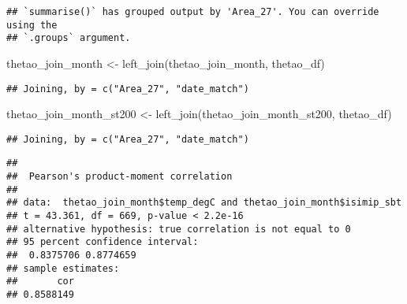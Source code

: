 \documentclass[
]{article}
\newenvironment{Shaded}{\begin{snugshade}}{\end{snugshade}}
\newcommand{\CommentTok}[1]{\textcolor[rgb]{0.56,0.35,0.01}{\textit{#1}}}
\newcommand{\FunctionTok}[1]{\textcolor[rgb]{0.00,0.00,0.00}{#1}}
\newcommand{\NormalTok}[1]{#1}
\newcommand{\OtherTok}[1]{\textcolor[rgb]{0.56,0.35,0.01}{#1}}
\newcommand{\SpecialCharTok}[1]{\textcolor[rgb]{0.00,0.00,0.00}{#1}}
\begin{document}
\begin{verbatim}
## `summarise()` has grouped output by 'Area_27'. You can override using the
## `.groups` argument.
\end{verbatim}

\begin{Shaded}
\begin{Highlighting}[]
\NormalTok{thetao\_join\_month }\OtherTok{\textless{}{-}} \FunctionTok{left\_join}\NormalTok{(thetao\_join\_month, thetao\_df)}
\end{Highlighting}
\end{Shaded}

\begin{verbatim}
## Joining, by = c("Area_27", "date_match")
\end{verbatim}

\begin{Shaded}
\begin{Highlighting}[]
\NormalTok{thetao\_join\_month\_st200 }\OtherTok{\textless{}{-}} \FunctionTok{left\_join}\NormalTok{(thetao\_join\_month\_st200, thetao\_df)}
\end{Highlighting}
\end{Shaded}

\begin{verbatim}
## Joining, by = c("Area_27", "date_match")
\end{verbatim}

\begin{Shaded}
\end{Shaded}

\begin{verbatim}
## 
##  Pearson's product-moment correlation
## 
## data:  thetao_join_month$temp_degC and thetao_join_month$isimip_sbt
## t = 43.361, df = 669, p-value < 2.2e-16
## alternative hypothesis: true correlation is not equal to 0
## 95 percent confidence interval:
##  0.8375706 0.8774659
## sample estimates:
##       cor 
## 0.8588149
\end{verbatim}
\end{document}
